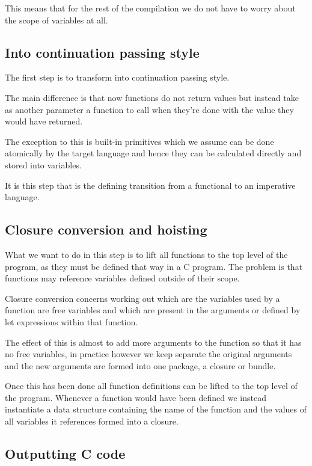 \documentclass[a4paper]{article}
\begin{document}
This means that for the rest of the compilation we do not have to worry about the scope of variables at all.



\subsection{Into continuation passing style}

The first step is to transform into continuation passing style.

The main difference is that now functions do not return values but instead take as another parameter a function to call when they're done with the value they would have returned.

The exception to this is built-in primitives which we assume can be done atomically by the target language and hence they can be calculated directly and stored into variables.

It is this step that is the defining transition from a functional to an imperative language.



\subsection{Closure conversion and hoisting}

What we want to do in this step is to lift all functions to the top level of the program, as they must be defined that way in a C program. The problem is that functions may reference variables defined outside of their scope.

Closure conversion concerns working out which are the variables used by a function are free variables and which are present in the arguments or defined by let expressions within that function.

The effect of this is almost to add more arguments to the function so that it has no free variables, in practice however we keep separate the original arguments and the new arguments are formed into one package, a closure or bundle.

Once this has been done all function definitions can be lifted to the top level of the program. Whenever a function would have been defined we instead instantiate a data structure containing the name of the function and the values of all variables it references formed into a closure.



\subsection{Outputting C code}
\end{document}
